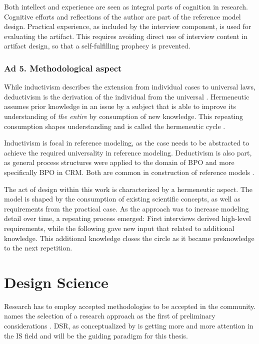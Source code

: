 Both intellect and experience are seen as integral parts of cognition in research. Cognitive efforts and reflections of the author are part of the reference model design. Practical experience, as included by the interview component, is used for evaluating the artifact. This requires avoiding direct use of interview content in artifact design, so that a self-fulfilling prophecy is prevented. 

\subsubsection{Ad 5. Methodological aspect}
While inductivism describes the extension from individual cases to universal laws, deductivism is the derivation of the individual from the universal \citep{seiffert2006einfhrung}. Hermeneutic assumes prior knowledge in an issue by a subject that is able to improve its understanding of \textit{the entire} by consumption of new knowledge. This repeating consumption shapes understanding and is called the hermeneutic cycle \citep{Butler1998}.

Inductivism is focal in reference modeling, as the case needs to be abstracted to achieve the required universality in reference modeling. Deductivism is also part, as general process  structures were applied to the domain of BPO and more specifically BPO in CRM. Both are common in construction of reference models \citep{thomas2006mang,Fettke2014meth}.

The act of design within this work is characterized by a hermeneutic aspect. The model is shaped by the consumption of existing scientific concepts, as well as requirements from the practical case. As the approach was to increase modeling detail over time, a repeating process emerged: First interviews derived high-level requirements, while the following gave new input that related to additional knowledge. This additional knowledge closes the circle as it became preknowledge to the next repetition. 

\section{Design Science}
Research has to employ accepted methodologies to be accepted in the community. \citeauthor{creswell2013research} names the selection of a research approach as the first of preliminary considerations \citep{creswell2013research}. \acrfull{DSR}, as conceptualized by \cite{simon1996sciences} is getting more and more attention in the \acrshort{IS} field and will be the guiding paradigm for this thesis. 


